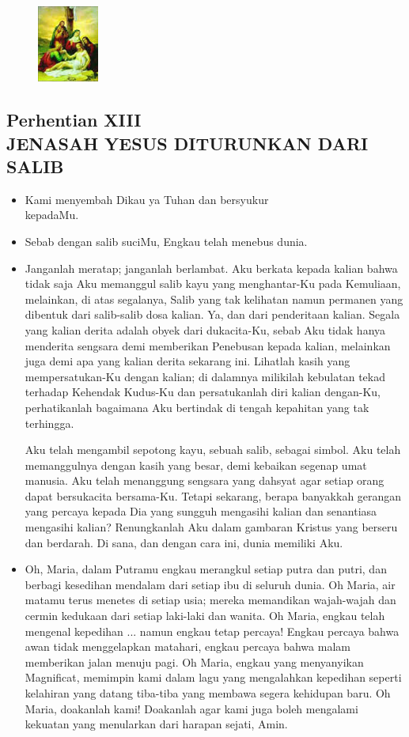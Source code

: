 \documentclass[a5paper,headsepline,titlepage,10pt,nnormalheadings,DIVcalc]{scrbook}
\newcommand{\BU}[1]{\begin{itemize} \item[U:] #1 \end{itemize}}
\newcommand{\BP}[1]{\begin{itemize} \item[P:] #1 \end{itemize}}
\newcommand{\kamiMenyembah}{\BP{ Kami menyembah Dikau ya Tuhan dan bersyukur\\kepadaMu.}
\BU{ Sebab dengan salib suciMu, Engkau telah menebus dunia.}
}
\begin{document}
\begin{figure}
\includegraphics[width=2cm]{jalansalib_files/13_small.jpg}
\end{figure}
\subsection*{Perhentian XIII\\
JENASAH YESUS DITURUNKAN DARI SALIB}

\kamiMenyembah

\BP{Janganlah meratap; janganlah berlambat. Aku berkata kepada kalian bahwa tidak saja Aku memanggul salib kayu yang menghantar-Ku pada Kemuliaan, melainkan, di atas segalanya, Salib yang tak kelihatan namun permanen yang dibentuk dari salib-salib dosa kalian. Ya, dan dari penderitaan kalian. Segala yang kalian derita adalah obyek dari dukacita-Ku, sebab Aku tidak hanya menderita sengsara demi memberikan Penebusan kepada kalian, melainkan juga demi apa yang kalian derita sekarang ini. Lihatlah kasih yang mempersatukan-Ku dengan kalian; di dalamnya milikilah kebulatan tekad terhadap Kehendak Kudus-Ku dan persatukanlah diri kalian dengan-Ku, perhatikanlah bagaimana Aku bertindak di tengah kepahitan yang tak terhingga.

Aku telah mengambil sepotong kayu, sebuah salib, sebagai simbol. Aku telah memanggulnya dengan kasih yang besar, demi kebaikan segenap umat manusia. Aku telah menanggung sengsara yang dahsyat agar setiap orang dapat bersukacita bersama-Ku. Tetapi sekarang, berapa banyakkah gerangan yang percaya kepada Dia yang sungguh mengasihi kalian dan senantiasa mengasihi kalian? Renungkanlah Aku dalam gambaran Kristus yang berseru dan berdarah. Di sana, dan dengan cara ini, dunia memiliki Aku.}

\BU{Oh, Maria, dalam Putramu engkau merangkul setiap putra dan putri, dan berbagi kesedihan mendalam dari setiap ibu di seluruh dunia. Oh Maria, air matamu terus menetes di setiap usia; mereka memandikan wajah-wajah dan cermin kedukaan dari setiap laki-laki dan wanita. Oh Maria, engkau telah mengenal kepedihan ... namun engkau tetap percaya! Engkau percaya bahwa awan tidak menggelapkan matahari, engkau percaya bahwa malam memberikan jalan menuju pagi. Oh Maria, engkau yang menyanyikan Magnificat, memimpin kami dalam lagu yang mengalahkan kepedihan seperti kelahiran yang datang tiba-tiba yang membawa segera kehidupan baru. Oh Maria, doakanlah kami! Doakanlah agar kami juga boleh mengalami 
kekuatan yang menularkan dari harapan sejati, Amin.}
\end{document}
